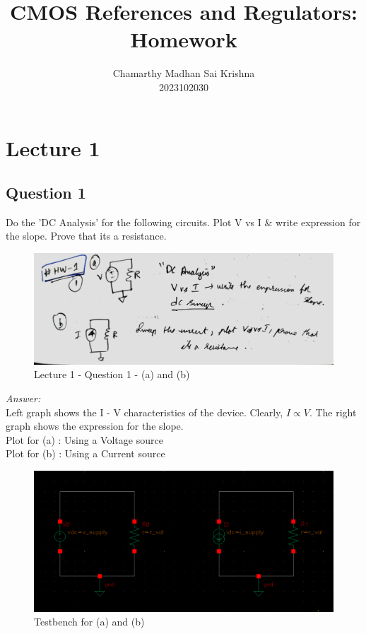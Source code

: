 \documentclass[a4paper]{article}
\title{\textbf{CMOS References and Regulators: Homework}}
\author{Chamarthy Madhan Sai Krishna\\2023102030}
\begin{document}
\maketitle

\tableofcontents

\section{Lecture 1}

\subsection{Question 1}
Do the 'DC Analysis' for the following circuits. Plot V vs I $\&$ write expression for the slope. Prove that its a resistance.\\
\begin{figure}
    \centering
    \includegraphics[width=0.8\linewidth]{images/Lec_1_Q_1.jpeg}
    \caption{Lecture 1 - Question 1 - (a) and (b)}
\end{figure}
\textit{Answer: }\\
Left graph shows the I - V characteristics of the device. Clearly, $I \propto V$. The right graph shows the expression for the slope. \\
Plot for (a) : Using a Voltage source \\
Plot for (b) : Using a Current source

\begin{figure}[ht]
    \centering
    \includegraphics[width=1\linewidth]{images/Lec_1_Q_1_testbench.png}
    \caption{Testbench for (a) and (b)}
\end{figure}
\end{document}
